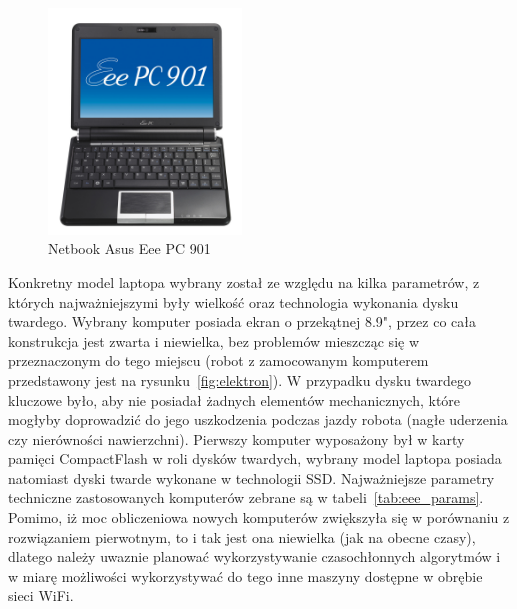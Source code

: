 \begin{figure}[h!]
\centering
\includegraphics[height=6cm]{../img/eee}
\caption{Netbook Asus Eee PC 901}
\label{fig:eee}
\end{figure}

Konkretny model laptopa wybrany został ze względu na kilka parametrów, z których
najważniejszymi były wielkość oraz technologia wykonania dysku twardego. Wybrany
komputer posiada ekran o przekątnej 8.9", przez co cała konstrukcja jest zwarta
i niewielka, bez problemów mieszcząc się w przeznaczonym do tego miejscu (robot
z zamocowanym komputerem przedstawony jest na rysunku~\ref{fig:elektron}). W przypadku
dysku twardego kluczowe było, aby nie posiadał żadnych elementów mechanicznych,
które mogłyby doprowadzić do jego uszkodzenia podczas jazdy robota (nagłe uderzenia
czy nierówności nawierzchni). Pierwszy komputer wyposażony był w karty pamięci
CompactFlash w roli dysków twardych, wybrany model laptopa posiada natomiast
dyski twarde wykonane w technologii SSD. Najważniejsze parametry techniczne
zastosowanych komputerów zebrane są w tabeli~\ref{tab:eee_params}.
Pomimo, iż moc obliczeniowa nowych komputerów zwiększyła się w porównaniu z
rozwiązaniem pierwotnym, to i tak jest ona niewielka (jak na obecne czasy),
dlatego należy uwaznie planować wykorzystywanie czasochłonnych algorytmów i w
miarę możliwości wykorzystywać do tego inne maszyny dostępne w obrębie sieci
WiFi.

